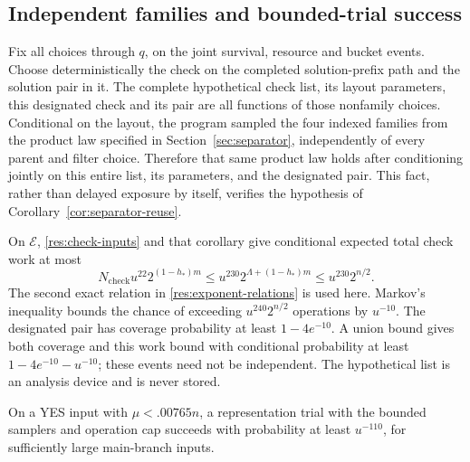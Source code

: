 \subsection{Independent families and bounded-trial success}

Fix all choices through \(q\), on the joint survival, resource and
bucket events. Choose deterministically the check on the completed
solution-prefix path and the solution pair in it. The complete
hypothetical check list, its layout parameters, this designated check
and its pair are all functions of those nonfamily choices. Conditional
on the layout, the program sampled the four indexed families from the
product law specified in Section~\ref{sec:separator}, independently
of every parent and filter choice. Therefore that same product law
holds after conditioning jointly on this entire list, its parameters,
and the designated pair. This fact, rather than delayed exposure by
itself, verifies the hypothesis of Corollary~\ref{cor:separator-reuse}.

On \(\mathcal E\), \eqref{res:check-inputs} and that corollary give
conditional expected total check work at most
\[
 N_{\mathrm{check}}u^{22}2^{(1-h_*)m}
 \le u^{230}2^{\Lambda+(1-h_*)m}
 \le u^{230}2^{n/2}.
\]
The second exact relation in \eqref{res:exponent-relations} is used
here. Markov's inequality bounds the chance of exceeding
\(u^{240}2^{n/2}\) operations by \(u^{-10}\). The designated pair has
coverage probability at least \(1-4e^{-10}\). A union bound gives
both coverage and this work bound with conditional probability at
least \(1-4e^{-10}-u^{-10}\); these events need not be independent.
The hypothetical list is an analysis device and is never stored.

\begin{lemma}\label{lem:resources}
On a YES input with \(\mu<.00765n\), a representation trial with
the bounded samplers and operation cap succeeds with probability at
least \(u^{-110}\), for sufficiently large main-branch inputs.
\end{lemma}

